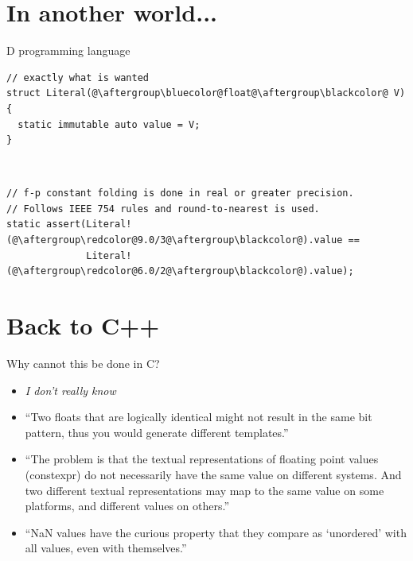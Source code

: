 \documentclass[xcolor=dvipsnames]{beamer}
\def\CC{{C\nolinebreak[4]\hspace{-.05em}\raisebox{.4ex}{\small\bf ++}}}
\begin{document}
\section{In another world...}


\begin{frame}[fragile]{D programming language}
\begin{lstlisting}
// exactly what is wanted
struct Literal(@\aftergroup\bluecolor@float@\aftergroup\blackcolor@ V)
{
  static immutable auto value = V;
}
\end{lstlisting}

~

\begin{lstlisting}
// f-p constant folding is done in real or greater precision.
// Follows IEEE 754 rules and round-to-nearest is used.
static assert(Literal!(@\aftergroup\redcolor@9.0/3@\aftergroup\blackcolor@).value ==
              Literal!(@\aftergroup\redcolor@6.0/2@\aftergroup\blackcolor@).value);
\end{lstlisting}
\end{frame}


\section{Back to {C++}}


\begin{frame}[fragile]{Why cannot this be done in \CC?}
  \begin{itemize}
  \item \emph{I don't really know} \vspace{5mm}
  \item ``Two floats that are logically identical might not result in the same bit pattern, thus you would generate different templates.'' \vspace{5mm}
  \item ``The problem is that the textual representations of floating point values (constexpr) do not necessarily have the same value on different systems. And two different textual representations may map to the same value on some platforms, and different values on others.'' \vspace{5mm}
  \item ``NaN values have the curious property that they compare as `unordered' with all values, even with themselves.'' \vspace{5mm}
  \end{itemize}
\end{frame}
\end{document}

